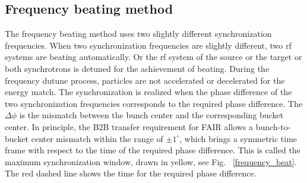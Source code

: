 \subsection{Frequency beating method}
\label{subsec:beating}

The frequency beating method uses two slightly different synchronization frequencies. When two synchronization frequencies are slightly different, two rf systems are beating automatically. Or the rf system of the source or the target or both synchrotrons is detuned for the achievement of beating. During the frequency dutune process, particles are not accelerated or decelerated for the energy match. The synchronization is realized when the phase difference of the two synchronization frequencies corresponds to the required phase difference. The $\Delta \phi$ is the mismatch between the bunch center and the corresponding bucket center. In principle, the B2B transfer requirement for FAIR allows a bunch-to-bucket center mismatch within the range of $\pm1^\circ$, which brings a symmetric time frame with respect to the time of the required phase difference. This is called the maximum synchronization window, drawn in yellow, see Fig. ~\ref{frequency_beat}. The red dashed line shows the time for the required phase difference.

